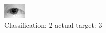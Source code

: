\begin{figure}[h!]
\begin{center}
\includegraphics[width=0.60\columnwidth]{figures/ID1081_class_2_target_3.png}
\end{center}
\caption{ Classification: 2 actual target: 3}
\label{fig:ID1081_class_2_target_3}
\end{figure}
